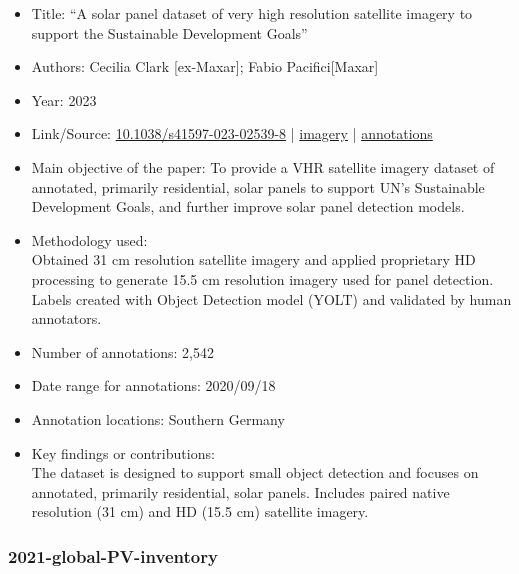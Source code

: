 \begin{itemize}
    \item Title: ``A solar panel dataset of very high resolution satellite imagery to support the Sustainable Development Goals''
    \item Authors: Cecilia Clark [ex-Maxar]; Fabio Pacifici[Maxar]
    \item Year: 2023
    \item Link/Source: \href{https://doi.org/10.1038/s41597-023-02539-8}{10.1038/s41597-023-02539-8} | 
    \href{https://resources.maxar.com/geospatial-foundation/15-cm-hd-and-30-cm-view-ready-solar-panels-germany}{imagery} |
    \href{https://figshare.com/articles/dataset/Solar_Panel_Object_Labels/22081091}{annotations}
    \item Main objective of the paper: 
    To provide a VHR satellite imagery dataset of annotated, primarily residential, solar panels to support UN's Sustainable Development Goals, and further improve solar panel detection models.
    \item Methodology used: \\
    Obtained 31 cm resolution satellite imagery and applied proprietary HD processing to generate 15.5 cm resolution imagery used for panel detection.
    Labels created with Object Detection model (YOLT) and validated by human annotators.
    \item Number of annotations: 2,542
    \item Date range for annotations: 2020/09/18
    \item Annotation locations: Southern Germany 
    \item Key findings or contributions: \\
    The dataset is designed to support small object detection and focuses on annotated, primarily residential, solar panels. 
    Includes paired native resolution (31 cm) and HD (15.5 cm) satellite imagery. 
\end{itemize}

\subsubsection{2021-global-PV-inventory}


